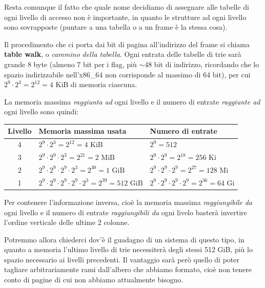 \documentclass[a4paper,11pt]{article}
\begin{document}
Resta comunque il fatto che quale nome decidiamo di assegnare alle tabelle di ogni livello di accesso non è importante, in quanto le strutture ad ogni livello sono sovrapposte (puntare a una tabella o a un frame è la stessa cosa).

Il procedimento che ci porta dai bit di pagina all'indirizzo del frame si chiama \textbf{table walk}, o \textit{cammino della tabella}.
Ogni entrata delle tabelle di trie sarà grande 8 byte (almeno 7 bit per i flag, più $\sim 48$ bit di indirizzo, ricordando che lo spazio indirizzabile nell'x86\_64 non corrisponde al massimo di 64 bit), per cui $2^9 \cdot 2^3 = 2^{12} = 4\text{ KiB}$ di memoria ciascuna.

La memoria massima \textit{raggiunta ad} ogni livello e il numero di entrate \textit{raggiunte ad} ogni livello sono quindi:

\begin{table}[H]
	\center {}
	\begin{tabular} { c | p{6cm} | p{6cm} }
		\bfseries Livello & \bfseries Memoria massima usata & \bfseries Numero di entrate \\ 
		\hline 
		4 & $2^9 \cdot 2^3 = 2^{12} = 4 \text{ KiB}$                       & $2^9 = 512$ \\
		3 & $2^9 \cdot 2^9 \cdot 2^3 = 2^{21} = 2 \text{ MiB}$             & $2^9 \cdot 2^9 = 2^{18} = 256 \text{ Ki}$ \\            
		2 & $2^9 \cdot 2^9 \cdot 2^9 \cdot 2^3 = 2^{30} = 1 \text{ GiB}$   & $2^9 \cdot 2^9 \cdot 2^9 = 2^{27} = 128 \text{ Mi}$ \\ 
		1 & $2^9 \cdot 2^9 \cdot 2^9 \cdot 2^9 \cdot 2^3 = 2^{39} = 512 \text{ GiB}$ & $2^9 \cdot 2^9 \cdot 2^9 \cdot 2^9 = 2^{36} = 64 \text{ Gi}$
	\end{tabular}
\end{table}

Per contenere l'informazione inversa, cioè la memoria massima \textit{raggiungibile da} ogni livello e il numero di entrate \textit{raggiungibili da} ogni livelo basterà invertire l'ordine verticale delle ultime 2 colonne. 

Potremmo allora chiederci dov'è il guadagno di un sistema di questo tipo, in quanto a memoria l'ultimo livello di trie necessiterà degli stessi 512 GiB, più lo spazio necessario ai livelli precedenti.
Il vantaggio sarà però quello di poter tagliare arbitrariamente rami dall'albero che abbiamo formato, cioè non tenere conto di pagine di cui non abbiamo attualmente bisogno. 
\end{document}

